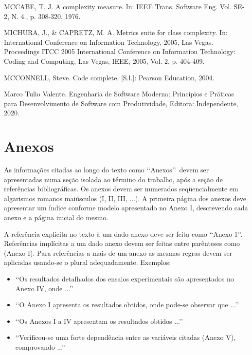 MCCABE, T. J. A complexity measure. In: IEEE Trans. Software Eng. Vol. SE-2, N. 4., p.
308-320, 1976.

MICHURA, J., & CAPRETZ, M. A. Metrics suite for class complexity. In: International
Conference on Information Technology, 2005, Las Vegas. Proceedings ITCC 2005
International Conference on Information Technology: Coding and Computing, Las
Vegas, IEEE, 2005, Vol. 2, p. 404-409.

MCCONNELL, Steve. Code complete. [S.l.]: Pearson Education, 2004.

Marco Tulio Valente. Engenharia de Software Moderna: Princípios e Práticas para Desenvolvimento de Software com Produtividade, Editora: Independente, 2020.

\section{Anexos}

As informações citadas ao longo do texto como \lq\lq Anexos\rq\rq\ devem ser 
apresentadas numa seção isolada ao término do trabalho, após a seção de 
referências bibliográficas. Os anexos devem ser numerados seqüencialmente em 
algarismos romanos maiúsculos (I, II, III, ...). A primeira página dos anexos 
deve apresentar um índice conforme modelo apresentado no Anexo I, descrevendo 
cada anexo e a página inicial do mesmo.

A referência explícita no texto à um dado anexo deve ser feita como 
\lq\lq Anexo 1\rq\rq. Referências implícitas a um dado anexo devem ser feitas 
entre parênteses como (Anexo I). Para referências a mais de um anexo as mesmas 
regras devem ser aplicadas usando-se o plural adequadamente. Exemplos:
\begin{itemize}
	\item \lq\lq Os resultados detalhados dos ensaios experimentais são 
	apresentados no Anexo IV, onde ...\rq\rq

	\item \lq\lq O Anexo I apresenta os resultados obtidos, onde pode-se 
	observar que ...\rq\rq

	\item \lq\lq Os Anexos I a IV apresentam os resultados obtidos ...\rq\rq

	\item \lq\lq Verificou-se uma forte dependência entre as variáveis citadas 
	(Anexo V), comprovando ...\rq\rq
\end{itemize}

